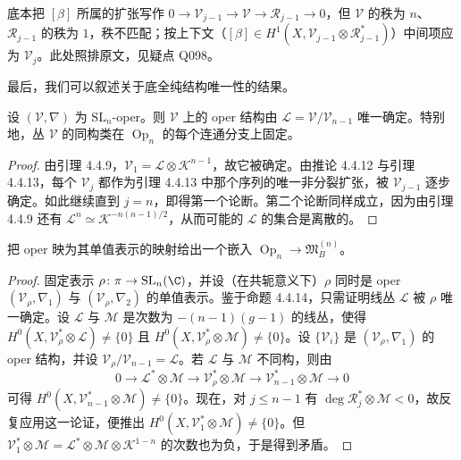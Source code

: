 \begin{annote}
底本把 $[\beta]$ 所属的扩张写作 $0\to\mathcal{V}_{j-1}\to\mathcal{V}\to\mathcal{R}_{j-1}\to0$，但 $\mathcal{V}$ 的秩为 $n$、$\mathcal{R}_{j-1}$ 的秩为 $1$，秩不匹配；按上下文（$[\beta]\in H^1(X,\mathcal{V}_{j-1}\otimes\mathcal{R}_{j-1}^*)$）中间项应为 $\mathcal{V}_j$。此处照排原文，见疑点 Q098。
\end{annote}

最后，我们可以叙述关于底全纯结构唯一性的结果。

\begin{proposition}
设 $(\mathcal{V},\nabla)$ 为 $\mathrm{SL}_n$-oper。则 $\mathcal{V}$ 上的 oper 结构由 $\mathcal{L}=\mathcal{V}/\mathcal{V}_{n-1}$ 唯一确定。特别地，丛 $\mathcal{V}$ 的同构类在 $\operatorname{Op}_n$ 的每个连通分支上固定。
\end{proposition}

\begin{proof}
由引理 4.4.9，$\mathcal{V}_1=\mathcal{L}\otimes\mathcal{K}^{n-1}$，故它被确定。由推论 4.4.12 与引理 4.4.13，每个 $\mathcal{V}_j$ 都作为引理 4.4.13 中那个序列的唯一非分裂扩张，被 $\mathcal{V}_{j-1}$ 逐步确定。如此继续直到 $j=n$，即得第一个论断。第二个论断同样成立，因为由引理 4.4.9 还有 $\mathcal{L}^n\simeq\mathcal{K}^{-n(n-1)/2}$，从而可能的 $\mathcal{L}$ 的集合是离散的。
\end{proof}

\begin{corollary}
把 oper 映为其单值表示的映射给出一个嵌入 $\operatorname{Op}_n\to\mathfrak{M}_B^{(n)}$。
\end{corollary}

\begin{proof}
固定表示 $\rho\colon\pi\to\mathrm{SL}_n(\C)$，并设（在共轭意义下）$\rho$ 同时是 oper $(\mathcal{V}_\rho,\nabla_1)$ 与 $(\mathcal{V}_\rho,\nabla_2)$ 的单值表示。鉴于命题 4.4.14，只需证明线丛 $\mathcal{L}$ 被 $\rho$ 唯一确定。设 $\mathcal{L}$ 与 $\mathcal{M}$ 是次数为 $-(n-1)(g-1)$ 的线丛，使得 $H^0(X,\mathcal{V}_\rho^*\otimes\mathcal{L})\ne\{0\}$ 且 $H^0(X,\mathcal{V}_\rho^*\otimes\mathcal{M})\ne\{0\}$。设 $\{\mathcal{V}_i\}$ 是 $(\mathcal{V}_\rho,\nabla_1)$ 的 oper 结构，并设 $\mathcal{V}_\rho/\mathcal{V}_{n-1}=\mathcal{L}$。若 $\mathcal{L}$ 与 $\mathcal{M}$ 不同构，则由
\[
0\to\mathcal{L}^*\otimes\mathcal{M}\to\mathcal{V}_\rho^*\otimes\mathcal{M}\to\mathcal{V}_{n-1}^*\otimes\mathcal{M}\to0
\]
可得 $H^0(X,\mathcal{V}_{n-1}^*\otimes\mathcal{M})\ne\{0\}$。现在，对 $j\le n-1$ 有 $\deg\mathcal{R}_j^*\otimes\mathcal{M}<0$，故反复应用这一论证，便推出 $H^0(X,\mathcal{V}_1^*\otimes\mathcal{M})\ne\{0\}$。但 $\mathcal{V}_1^*\otimes\mathcal{M}=\mathcal{L}^*\otimes\mathcal{M}\otimes\mathcal{K}^{1-n}$ 的次数也为负，于是得到矛盾。
\end{proof}

